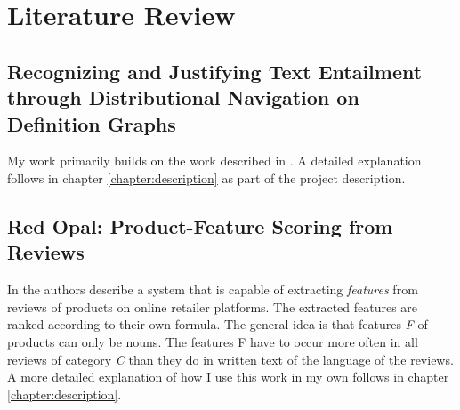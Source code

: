 \begingroup
\renewcommand{\cleardoublepage}{}
\renewcommand{\clearpage}{}
\chapter{Literature Review}
\section{Recognizing and Justifying Text Entailment through Distributional Navigation on Definition Graphs}
My work primarily builds on the work described in \cite{silva2018recognizing}. A detailed explanation follows in chapter \ref{chapter:description} as part of the project description.

\section{Red Opal: Product-Feature Scoring from Reviews}
In \cite{scaffidi2007red} the authors describe a system that is capable of extracting \textit{features} from reviews of products on online retailer platforms. The extracted features are ranked according to their own formula. The general idea is that features \textit{F} of products can only be nouns. The features F have to occur more often in all reviews of category \textit{C} than they do in written text of the language of the reviews. A more detailed explanation of how I use this work in my own follows in chapter \ref{chapter:description}.

